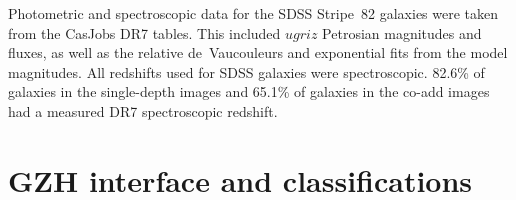 \documentclass[twocolumn]{aastex6}
\begin{document}

Photometric and spectroscopic data for the SDSS Stripe~82 galaxies were taken
from the CasJobs DR7 tables. This included $ugriz$ Petrosian magnitudes and
fluxes, as well as the relative de~Vaucouleurs and exponential fits from the
model magnitudes. All redshifts used for SDSS galaxies were spectroscopic.
82.6\% of galaxies in the single-depth images and 65.1\% of galaxies in the
co-add images had a measured DR7 spectroscopic redshift. 

\section{GZH interface and classifications}\label{sec:interface}
\end{document}
